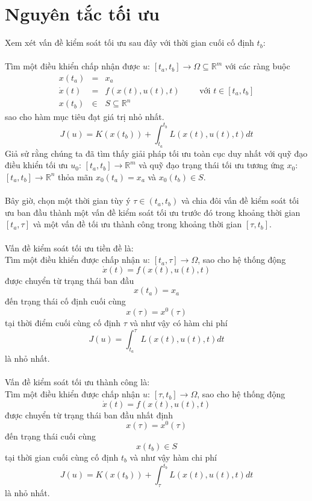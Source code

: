 \documentclass[12pt,a4paper]{report}
\begin{document}
	\section{Nguyên tắc tối ưu}
	Xem xét vấn đề kiểm soát tối ưu sau đây với thời gian cuối cố định $t_b$:\\\\Tìm một điều khiển chấp nhận được $u$: $[t_a, t_b] \to \Omega \subseteq \mathbb{R}^m$ với các ràng buộc \begin{eqnarray}
		x(t_a) &=& x_a \nonumber \\ \dot{x}(t) &=& f(x(t), u(t), t) \qquad \text{ với } t \in [t_a, t_b] \nonumber \\ x(t_b)&\in& S \subseteq \mathbb{R}^n \nonumber
	\end{eqnarray} sao cho hàm mục tiêu đạt giá trị nhỏ nhất. $$J(u) = K(x(t_b)) + \int_{t_a}^{t_b}L(x(t),u(t), t)dt$$
	Giả sử rằng chúng ta đã tìm thấy giải pháp tối ưu toàn cục duy nhất với quỹ đạo điều khiển tối ưu $u_0$: $[t_a, t_b] \to \mathbb{R}^m$ và quỹ đạo trạng thái tối ưu tương ứng $x_0$: $[t_a, t_b] \to \mathbb{R}^n$ thỏa mãn $x_0 (t_a) = x_a$ và $x_0(t_b) \in S$.
	\\\\Bây giờ, chọn một thời gian tùy ý $\tau \in(t_a, t_b)$ và chia đôi vấn đề kiểm soát tối ưu ban đầu thành một vấn đề kiểm soát tối ưu trước đó trong khoảng thời gian $[t_a,\tau]$ và một vấn đề tối ưu thành công trong khoảng thời gian $[\tau, t_b]$.\\\\Vấn đề kiểm soát tối ưu tiền đề là:\\Tìm một điều khiển được chấp nhận $u$: $[t_a, \tau] \to \Omega$, sao cho hệ thống động $$\dot{x}(t) = f(x(t),u(t),t)$$ được chuyển từ trạng thái ban đầu $$x(t_a) = x_a$$ đến trạng thái cố định cuối cùng $$x(\tau) = x^0(\tau)$$ tại thời điểm cuối cùng cố định $\tau$ và như vậy có hàm chi phí $$J(u) = \int_{t_a}^{\tau}L(x(t),u(t),t)dt$$ là nhỏ nhất.\\\\Vấn đề kiểm soát tối ưu thành công là:\\
	Tìm một điều khiển được chấp nhận $u$: $[\tau, t_b] \to \Omega$, sao cho hệ thống động $$\dot{x}(t) = f(x(t),u(t),t)$$ 
	được chuyển từ trạng thái ban đầu nhất định $$x(\tau) = x^0(\tau)$$ đến trạng thái cuối cùng $$x(t_b) \in S$$ tại thời gian cuối cùng cố định $t_b$ và như vậy hàm chi phí $$J(u) = K(x(t_b)) + \int_{\tau}^{t_b}L(x(t),u(t),t)dt$$ là nhỏ nhất.\\\\
\end{document}
